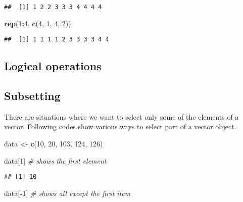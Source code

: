 \documentclass[]{book}
\newenvironment{Shaded}{\begin{snugshade}}{\end{snugshade}}
\newcommand{\CommentTok}[1]{\textcolor[rgb]{0.56,0.35,0.01}{\textit{#1}}}
\newcommand{\DecValTok}[1]{\textcolor[rgb]{0.00,0.00,0.81}{#1}}
\newcommand{\KeywordTok}[1]{\textcolor[rgb]{0.13,0.29,0.53}{\textbf{#1}}}
\newcommand{\NormalTok}[1]{#1}
\newcommand{\OperatorTok}[1]{\textcolor[rgb]{0.81,0.36,0.00}{\textbf{#1}}}
\newcommand{\StringTok}[1]{\textcolor[rgb]{0.31,0.60,0.02}{#1}}
\begin{document}
\begin{verbatim}
##  [1] 1 2 2 3 3 3 4 4 4 4
\end{verbatim}

\begin{Shaded}
\begin{Highlighting}[]
\KeywordTok{rep}\NormalTok{(}\DecValTok{1}\OperatorTok{:}\DecValTok{4}\NormalTok{, }\KeywordTok{c}\NormalTok{(}\DecValTok{4}\NormalTok{, }\DecValTok{1}\NormalTok{, }\DecValTok{4}\NormalTok{, }\DecValTok{2}\NormalTok{))}
\end{Highlighting}
\end{Shaded}

\begin{verbatim}
##  [1] 1 1 1 1 2 3 3 3 3 4 4
\end{verbatim}

\hypertarget{logical-operations}{%
\subsection{Logical operations}\label{logical-operations}}

\hypertarget{subsetting}{%
\subsection{Subsetting}\label{subsetting}}

There are situations where we want to select only some of the elements of a vector. Following codes show various ways to select part of a vector object.

\begin{Shaded}
\begin{Highlighting}[]
\NormalTok{data <-}\StringTok{ }\KeywordTok{c}\NormalTok{(}\DecValTok{10}\NormalTok{, }\DecValTok{20}\NormalTok{, }\DecValTok{103}\NormalTok{, }\DecValTok{124}\NormalTok{, }\DecValTok{126}\NormalTok{)}

\NormalTok{data[}\DecValTok{1}\NormalTok{] }\CommentTok{# shows the first element }
\end{Highlighting}
\end{Shaded}

\begin{verbatim}
## [1] 10
\end{verbatim}

\begin{Shaded}
\begin{Highlighting}[]
\NormalTok{data[}\OperatorTok{-}\DecValTok{1}\NormalTok{] }\CommentTok{# shows all except the first item}
\end{Highlighting}
\end{Shaded}
\end{document}
